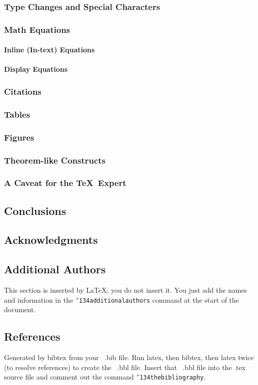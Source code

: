 \documentclass{sig-alternate-05-2015}
\begin{document}
\subsubsection{Type Changes and  Special Characters}
\subsubsection{Math Equations}
\paragraph{Inline (In-text) Equations}
\paragraph{Display Equations}
\subsubsection{Citations}
\subsubsection{Tables}
\subsubsection{Figures}
\subsubsection{Theorem-like Constructs}
\subsubsection*{A Caveat for the \TeX\ Expert}
\subsection{Conclusions}
\subsection{Acknowledgments}
\subsection{Additional Authors}
This section is inserted by \LaTeX; you do not insert it.
You just add the names and information in the
\texttt{{\char'134}additionalauthors} command at the start
of the document.
\subsection{References}
Generated by bibtex from your ~.bib file.  Run latex,
then bibtex, then latex twice (to resolve references)
to create the ~.bbl file.  Insert that ~.bbl file into
the .tex source file and comment out
the command \texttt{{\char'134}thebibliography}.
\end{document}
